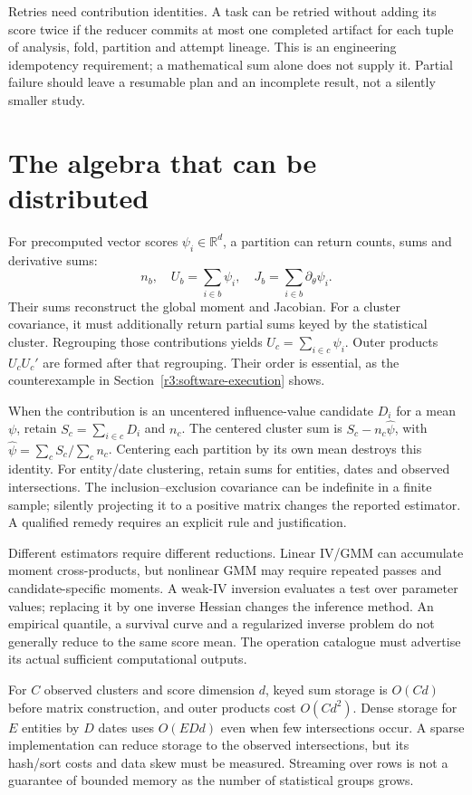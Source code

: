 Retries need contribution identities. A task can be retried without
adding its score twice if the reducer commits at most one completed
artifact for each tuple of analysis, fold, partition and attempt lineage.
This is an engineering idempotency requirement; a mathematical sum
alone does not supply it. Partial failure should leave a resumable plan
and an incomplete result, not a silently smaller study.

\section{The algebra that can be distributed}
\label{r3:distributed-algebra}

For precomputed vector scores $\psi_i\in\mathbb R^d$, a partition can
return counts, sums and derivative sums:
\[
 n_b,\quad U_b=\sum_{i\in b}\psi_i,\quad
 J_b=\sum_{i\in b}\partial_\theta\psi_i.
\]
Their sums reconstruct the global moment and Jacobian. For a cluster
covariance, it must additionally return partial sums keyed by the
statistical cluster. Regrouping those contributions yields
$U_c=\sum_{i\in c}\psi_i$. Outer products $U_cU_c'$ are formed after
that regrouping. Their order is essential, as the counterexample in
Section~\ref{r3:software-execution} shows.

When the contribution is an uncentered influence-value candidate $D_i$
for a mean $\psi$, retain $S_c=\sum_{i\in c}D_i$ and $n_c$.
The centered cluster sum is
$S_c-n_c\widehat\psi$, with $\widehat\psi=\sum_cS_c/\sum_cn_c$.
Centering each partition by its own mean destroys this identity.
For entity/date clustering, retain sums for entities, dates and observed
intersections. The inclusion--exclusion covariance can be indefinite
in a finite sample; silently projecting it to a positive matrix changes
the reported estimator. A qualified remedy requires an explicit rule
and justification.

Different estimators require different reductions. Linear IV/GMM can
accumulate moment cross-products, but nonlinear GMM may require repeated
passes and candidate-specific moments. A weak-IV inversion evaluates
a test over parameter values; replacing it by one inverse Hessian changes
the inference method. An empirical quantile, a survival curve and a
regularized inverse problem do not generally reduce to the same score
mean. The operation catalogue must advertise its actual sufficient
computational outputs.

For $C$ observed clusters and score dimension $d$, keyed sum storage is
$O(Cd)$ before matrix construction, and outer products cost $O(Cd^2)$.
Dense storage for $E$ entities by $D$ dates uses $O(EDd)$ even when few
intersections occur. A sparse implementation can reduce storage to
the observed intersections, but its hash/sort costs and data skew must
be measured. Streaming over rows is not a guarantee of bounded memory
as the number of statistical groups grows.

